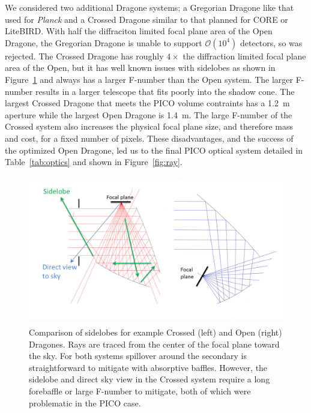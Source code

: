 \documentclass[]{spie}  %
\begin{document}
We considered two additional Dragone systems; a Gregorian Dragone like that used for \textit{Planck} and a Crossed Dragone similar to that planned 
for CORE or LiteBIRD.  With half the diffraciton limited focal plane area of the Open Dragone,\cite{core2018_inst} the Gregorian Dragone is 
unable to support $\mathcal{O}(10^4)$ detectors, so was rejected.  
The Crossed Dragone has roughly $4\times$ the diffraction limited focal plane area of the Open, but it has well 
known issues with sidelobes as shown in Figure~\ref{fig:sidelobes} and always has a larger F-number than the Open system.  The larger 
F-number results in a larger telescope that fits poorly into the shadow cone. The largest Crossed Dragone that meets the PICO volume contraints has 
a 1.2~m aperture while the largest Open Dragone is 1.4~m. The large F-number of the Crossed system also increases 
the physical focal plane size, and therefore mass and cost, for a fixed number of pixels.  These disadvantages, and the success of the optimized 
Open Dragone, led us to the final PICO optical system detailed in Table~\ref{tab:optics} and shown in Figure~\ref{fig:ray}.


\begin{figure} [ht]
\begin{center}
\includegraphics[height=6.5cm]{sidelobes.png}
\end{center}
\caption { \label{fig:sidelobes} 
Comparison of sidelobes for example Crossed (left) and Open (right) Dragones.  Rays are traced from the center of the focal plane toward the sky.
For both systems spillover around the secondary is straightforward to mitigate with absorptive baffles.  However, the sidelobe and direct 
sky view in the Crossed system require a long forebaffle or large F-number to mitigate, both of which were problematic in the PICO case.}
\end{figure} 
\end{document}
